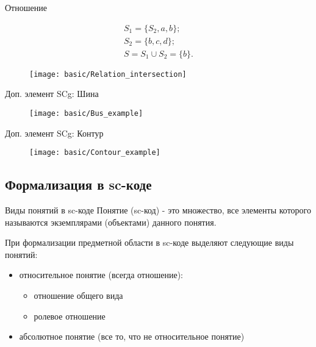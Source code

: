 \begin{frame}[shrink=10]{Отношение }
  \begin{center}
    \begin{eqnarray*}
      S_1 = \{ S_2, a, b \}; \\
      S_2 = \{ b, c, d \}; \\
      S = S_1 \cup S_2 = \{ b \}.
    \end{eqnarray*}

    \objeqv

    \begin{figure}
      \texttt{[image: basic/Relation\_intersection]}
    \end{figure}
  \end{center}
\end{frame}

\begin{frame}{Доп. элемент SCg: Шина}
  \begin{center}
    \begin{figure}
      \texttt{[image: basic/Bus\_example]}
    \end{figure}
  \end{center}
\end{frame}

\begin{frame}{Доп. элемент SCg: Контур}
  \begin{center}
    \begin{figure}
      \texttt{[image: basic/Contour\_example]}
    \end{figure}
  \end{center}
\end{frame}

\subsection{Формализация в sc-коде}

\begin{frame}{Виды понятий в sc-коде}
  Понятие (sc-код) - это множество, все элементы которого называются
  экземплярами (объектами) данного понятия.


  При формализации предметной области в sc-коде выделяют следующие
  виды понятий:
  \begin{itemize}
  \item относительное понятие (всегда отношение):
    \begin{itemize}
    \item отношение общего вида
    \item ролевое отношение
    \end{itemize}
  \item абсолютное понятие (все то, что не относительное понятие)
  \end{itemize}
\end{frame}


